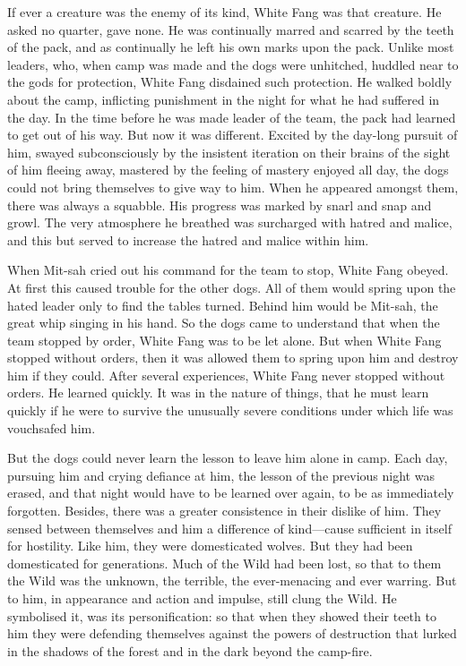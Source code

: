 \documentclass[10pt]{book}
\begin{document}
If ever a creature was the enemy of its kind, White Fang was that
creature. He asked no quarter, gave none. He was continually marred and
scarred by the teeth of the pack, and as continually he left his own
marks upon the pack. Unlike most leaders, who, when camp was made and
the dogs were unhitched, huddled near to the gods for protection, White
Fang disdained such protection. He walked boldly about the camp,
inflicting punishment in the night for what he had suffered in the day.
In the time before he was made leader of the team, the pack had learned
to get out of his way. But now it was different. Excited by the
day-long pursuit of him, swayed subconsciously by the insistent
iteration on their brains of the sight of him fleeing away, mastered by
the feeling of mastery enjoyed all day, the dogs could not bring
themselves to give way to him. When he appeared amongst them, there was
always a squabble. His progress was marked by snarl and snap and growl.
The very atmosphere he breathed was surcharged with hatred and malice,
and this but served to increase the hatred and malice within him.

When Mit-sah cried out his command for the team to stop, White Fang
obeyed. At first this caused trouble for the other dogs. All of them
would spring upon the hated leader only to find the tables turned.
Behind him would be Mit-sah, the great whip singing in his hand. So the
dogs came to understand that when the team stopped by order, White Fang
was to be let alone. But when White Fang stopped without orders, then
it was allowed them to spring upon him and destroy him if they could.
After several experiences, White Fang never stopped without orders. He
learned quickly. It was in the nature of things, that he must learn
quickly if he were to survive the unusually severe conditions under
which life was vouchsafed him.

But the dogs could never learn the lesson to leave him alone in camp.
Each day, pursuing him and crying defiance at him, the lesson of the
previous night was erased, and that night would have to be learned over
again, to be as immediately forgotten. Besides, there was a greater
consistence in their dislike of him. They sensed between themselves and
him a difference of kind—cause sufficient in itself for hostility. Like
him, they were domesticated wolves. But they had been domesticated for
generations. Much of the Wild had been lost, so that to them the Wild
was the unknown, the terrible, the ever-menacing and ever warring. But
to him, in appearance and action and impulse, still clung the Wild. He
symbolised it, was its personification: so that when they showed their
teeth to him they were defending themselves against the powers of
destruction that lurked in the shadows of the forest and in the dark
beyond the camp-fire.
\end{document}
